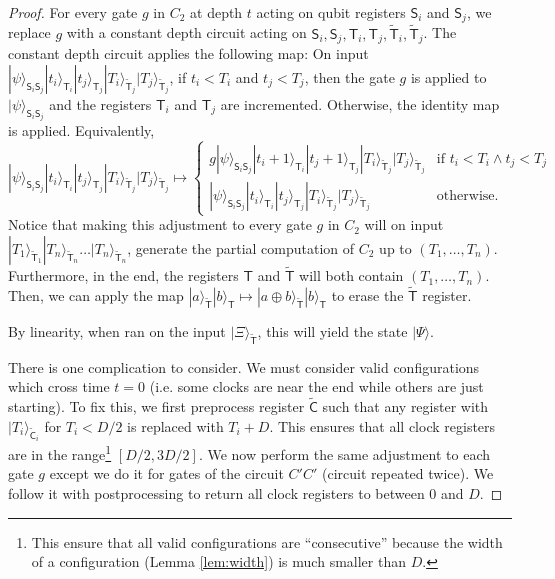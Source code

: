 \documentclass[11pt,letterpaper]{article}
\theoremstyle{definition}
\theoremstyle{remark}
\numberwithin{equation}{section}
\theoremstyle{definition}
\newcommand{\ket}[1]{|#1\rangle}
\newcommand{\sC}{{\mathsf{C}}}
\newcommand{\sS}{{\mathsf{S}}}
\newcommand{\sT}{{\mathsf{T}}}
\begin{document}
\begin{proof}
For every gate $g$ in $C_2$ at depth $t$ acting on qubit registers $\sS_i$ and $\sS_j$, we replace $g$ with a constant depth circuit acting on $\sS_i, \sS_j, \sT_i, \sT_j, \widetilde{\sT}_i, \widetilde{\sT}_j$. The constant depth circuit applies the following map: On input $\ket{\psi}_{\sS_i \sS_j} \ket{t_i}_{\sT_i} \ket{t_j}_{\sT_j} \ket{T_i}_{\widetilde{\sT}_j} \ket{T_j}_{\widetilde{\sT}_j}$, if $t_i < T_i$ and $t_j < T_j$, then the gate $g$ is applied to $\ket{\psi}_{\sS_i \sS_j}$ and the registers $\sT_i$ and $\sT_j$ are incremented. Otherwise, the identity map is applied. Equivalently,
\begin{equation}
\ket{\psi}_{\sS_i \sS_j} \ket{t_i}_{\sT_i} \ket{t_j}_{\sT_j} \ket{T_i}_{\widetilde{\sT}_j} \ket{T_j}_{\widetilde{\sT}_j} \mapsto 
\begin{cases}
g \ket{\psi}_{\sS_i \sS_j} \ket{t_i + 1}_{\sT_i} \ket{t_j + 1}_{\sT_j} \ket{T_i}_{\widetilde{\sT}_j} \ket{T_j}_{\widetilde{\sT}_j} & \text{if } t_i < T_i \land t_j < T_j \\
\ket{\psi}_{\sS_i \sS_j} \ket{t_i}_{\sT_i} \ket{t_j}_{\sT_j} \ket{T_i}_{\widetilde{\sT}_j} \ket{T_j}_{\widetilde{\sT}_j} & \text{otherwise}.
\end{cases}
\end{equation}
Notice that making this adjustment to every gate $g$ in $C_2$ will on input $\ket{T_1}_{\widetilde{\sT}_1}\ket{T_n}_{\widetilde{\sT}_n}\ldots \ket{T_n}_{\widetilde{\sT}_n}$, generate the partial computation of $C_2$ up to $(T_1, \ldots, T_n)$. Furthermore, in the end, the registers $\sT$ and $\widetilde{\sT}$ will both contain $(T_1, \ldots, T_n)$. Then, we can apply the map $\ket{a}_{\widetilde{\sT}} \ket{b}_\sT \mapsto \ket{a \oplus b}_{\widetilde{\sT}} \ket{b}_{\sT}$ to erase the $\widetilde{\sT}$ register.

By linearity, when ran on the input $\ket{\Xi}_{\widetilde{\sT}}$, this will yield the state $\ket{\Psi}$.

There is one complication to consider. We must consider valid configurations which cross time $t = 0$ (i.e. some clocks are near the end while others are just starting). To fix this, we first preprocess register $\widetilde{\sC}$ such that any register with $\ket{T_i}_{\widetilde{\sC}_i}$ for $T_i < D/2$ is replaced with $T_i + D$. This ensures that all clock registers are in the range\footnote{This ensure that all valid configurations are ``consecutive'' because the width of a configuration (Lemma \ref{lem:width}) is much smaller than $D$.} $[D/2, 3D/2]$. We now perform the same adjustment to each gate $g$ except we do it for gates of the circuit $C' C'$ (circuit repeated twice). We follow it with postprocessing to return all clock registers to between $0$ and $D$.


\end{proof}
\end{document}
